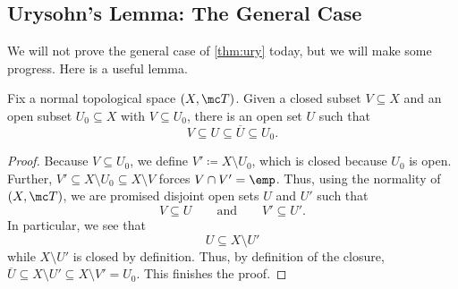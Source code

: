 \documentclass[../notes.tex]{subfiles}
\begin{document}
\subsection{Urysohn's Lemma: The General Case}
We will not prove the general case of \autoref{thm:ury} today, but we will make some progress. Here is a useful lemma.
\begin{lemma} \label{lem:usenormal}
	Fix a normal topological space $(X,\mc T)$. Given a closed subset $V\subseteq X$ and an open subset $U_0\subseteq X$ with $V\subseteq U_0$, there is an open set $U$ such that
	\[V\subseteq U\subseteq\overline U\subseteq U_0.\]
\end{lemma}
\begin{proof}
	Because $V\subseteq U_0$, we define $V'\coloneqq X\setminus U_0$, which is closed because $U_0$ is open. Further, $V'\subseteq X\setminus U_0\subseteq X\setminus V$ forces $V\cap V'=\emp$. Thus, using the normality of $(X,\mc T)$, we are promised disjoint open sets $U$ and $U'$ such that
	\[V\subseteq U\qquad\text{and}\qquad V'\subseteq U'.\]
	In particular, we see that
	\[U\subseteq X\setminus U'\]
	while $X\setminus U'$ is closed by definition. Thus, by definition of the closure, $\overline U\subseteq X\setminus U'\subseteq X\setminus V'=U_0$. This finishes the proof.
\end{proof}
\end{document}
